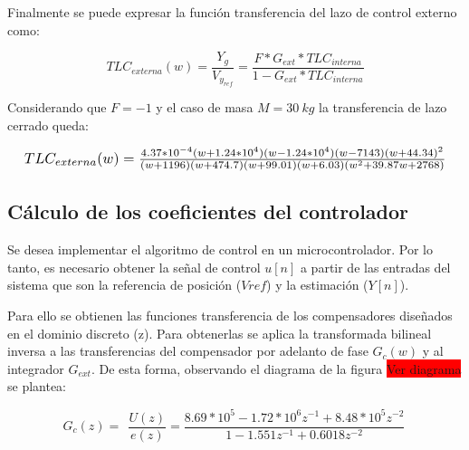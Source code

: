 Finalmente se puede expresar la función transferencia del lazo de control externo como:

\begin{equation}
	TLC_{externa}(w)=\frac{Y_g}{V_{y_{ref}}}=\frac{F*G_{ext}*TLC_{interna}}{1-G_{ext}*TLC_{interna}}
\end{equation}

Considerando que $F=-1$ y el caso de masa $M=30\:kg$ la transferencia de lazo cerrado queda:

\begin{equation*}
	\resizebox{.99\hsize}{!}
	{
		$
		TLC_{externa}(w)=\frac{4.37*10^{-4} (w+1.24*10^{4}) (w-1.24*10^{4}) (w-7143) (w+44.34)^2}{(w+1196) (w+474.7) (w+99.01) (w+6.03) (w^2 + 39.87w + 2768)}
		$
	}
\end{equation*}



\subsection{Cálculo de los coeficientes del controlador}


Se desea implementar el algoritmo de control en un microcontrolador. Por lo tanto, es necesario obtener la señal de control $u[n]$ a partir de las entradas del sistema que son la referencia de posición ($Vref$) y la estimación ($Y[n]$). 

Para ello se obtienen las funciones transferencia de los compensadores diseñados en el dominio discreto (z). Para obtenerlas se aplica la transformada bilineal inversa a las transferencias del compensador por adelanto de fase $G_c(w)$ y al integrador $G_{ext}$. De esta forma, observando el diagrama de la figura \colorbox{red}{Ver diagrama} se plantea:

%
%

\begin{equation} \label{eq_coeficientes_interno} 
	G_c(z)=\ \ \frac{U(z)}{e(z)}=\frac{8.69*10^5- 1.72*10^6z^{-1} + 8.48*10^5z^{-2}}{1-1.551 z^{-1} + 0.6018 z^{-2}}\  
\end{equation} 

